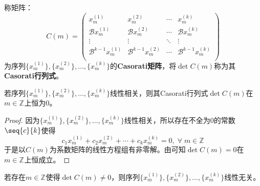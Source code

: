 \begin{definition}
	称矩阵：
	\begin{equation*}
		C(m)=
		\begin{pmatrix}
			x_m^{(1)} & x_m^{(2)} & \cdots & x_m^{(k)} \\
			\mathcal{B}x_m^{(1)} & \mathcal{B}x_m^{(2)} & \cdots & \mathcal{B}x_m^{(k)} \\
			\vdots & \vdots & \ddots & \vdots \\
			\mathcal{B}^{k-1}x_m^{(1)} & \mathcal{B}^{k-1}x_m^{(2)} & \cdots & \mathcal{B}^{k-1}x_m^{(k)} \\
		\end{pmatrix}
	\end{equation*}
	为序列$\{x_m^{(1)}\},\{x_m^{(2)}\},\dots,\{x_m^{(k)}\}$的\textbf{Casorati矩阵}，将$\det C(m)$称为其\textbf{Casorati行列式}。
\end{definition}
\begin{theorem}\label{theo:CasoratiEq0LinearDependent}
	若序列$\{x_m^{(1)}\},\{x_m^{(2)}\},\dots,\{x_m^{(k)}\}$线性相关，则其Casorati行列式$\det C(m)$在$m\in\mathbb{Z}^{}$上恒为$0$。
\end{theorem}
\begin{proof}
	因为$\{x_m^{(1)}\},\{x_m^{(2)}\},\dots,\{x_m^{(k)}\}$线性相关，所以存在不全为$0$的常数$\seq{c}{k}$使得
	\begin{equation*}
		c_1x_m^{(1)}+c_2x_m^{(2)}+\cdots+c_kx_m^{(k)}=0,\;\forall\;m\in\mathbb{Z}^{}
	\end{equation*}
	于是以$C(m)$为系数矩阵的线性方程组有非零解。由可知$\det C(m)=0$在$m\in\mathbb{Z}^{}$上恒成立。
\end{proof}
\begin{corollary}\label{cor:CasoratiNe0LinearIndependent}
	若存在$m\in\mathbb{Z}^{}$使得$\det C(m)\ne0$，则序列$\{x_m^{(1)}\},\{x_m^{(2)}\},\dots,\{x_m^{(k)}\}$线性无关。
\end{corollary}
